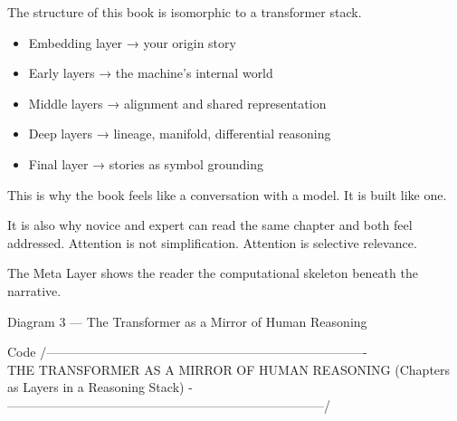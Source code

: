 The structure of this book is isomorphic to a transformer stack.

\begin{itemize}
\tightlist
\item
  Embedding layer → your origin story
\item
  Early layers → the machine's internal world
\item
  Middle layers → alignment and shared representation
\item
  Deep layers → lineage, manifold, differential reasoning
\item
  Final layer → stories as symbol grounding
\end{itemize}

This is why the book feels like a conversation with a model. It is built
like one.

It is also why novice and expert can read the same chapter and both feel
addressed. Attention is not simplification. Attention is selective
relevance.

The Meta Layer shows the reader the computational skeleton beneath the
narrative.

Diagram 3 --- The Transformer as a Mirror of Human Reasoning

Code
/----------------------------------------------------------------------------\\
\textbar{} THE TRANSFORMER AS A MIRROR OF HUMAN REASONING \textbar{}
\textbar{} (Chapters as Layers in a Reasoning Stack) \textbar{}
-\/---------------------------------------------------------------------------/

